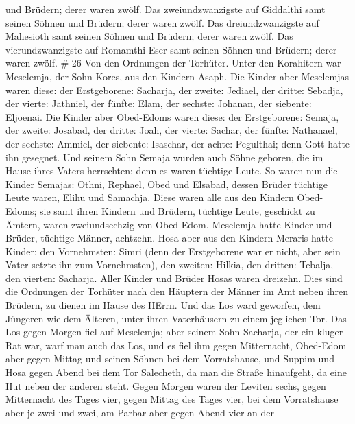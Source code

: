 und Brüdern; derer waren zwölf.  Das zweiundzwanzigste auf
Giddalthi samt seinen Söhnen und Brüdern; derer waren zwölf.
 Das dreiundzwanzigste auf Mahesioth samt seinen Söhnen und
Brüdern; derer waren zwölf.  Das vierundzwanzigste auf
Romamthi-Eser samt seinen Söhnen und Brüdern; derer waren zwölf. \# 26
 Von den Ordnungen der Torhüter. Unter den Korahitern war
Meselemja, der Sohn Kores, aus den Kindern Asaph.  Die
Kinder aber Meselemjas waren diese: der Erstgeborene: Sacharja, der
zweite: Jediael, der dritte: Sebadja, der vierte: Jathniel, 
der fünfte: Elam, der sechste: Johanan, der siebente: Eljoenai.
 Die Kinder aber Obed-Edoms waren diese: der Erstgeborene:
Semaja, der zweite: Josabad, der dritte: Joah, der vierte: Sachar, der
fünfte: Nathanael,  der sechste: Ammiel, der siebente:
Isaschar, der achte: Pegulthai; denn Gott hatte ihn gesegnet.
 Und seinem Sohn Semaja wurden auch Söhne geboren, die im
Hause ihres Vaters herrschten; denn es waren tüchtige Leute.
 So waren nun die Kinder Semajas: Othni, Rephael, Obed und
Elsabad, dessen Brüder tüchtige Leute waren, Elihu und Samachja.
 Diese waren alle aus den Kindern Obed-Edoms; sie samt ihren
Kindern und Brüdern, tüchtige Leute, geschickt zu Ämtern, waren
zweiundsechzig von Obed-Edom.  Meselemja hatte Kinder und
Brüder, tüchtige Männer, achtzehn.  Hosa aber aus den
Kindern Meraris hatte Kinder: den Vornehmsten: Simri (denn der
Erstgeborene war er nicht, aber sein Vater setzte ihn zum Vornehmsten),
 den zweiten: Hilkia, den dritten: Tebalja, den vierten:
Sacharja. Aller Kinder und Brüder Hosas waren dreizehn. 
Dies sind die Ordnungen der Torhüter nach den Häuptern der Männer im Amt
neben ihren Brüdern, zu dienen im Hause des HErrn.  Und das
Los ward geworfen, dem Jüngeren wie dem Älteren, unter ihren
Vaterhäusern zu einem jeglichen Tor.  Das Los gegen Morgen
fiel auf Meselemja; aber seinem Sohn Sacharja, der ein kluger Rat war,
warf man auch das Los, und es fiel ihm gegen Mitternacht, 
Obed-Edom aber gegen Mittag und seinen Söhnen bei dem Vorratshause,
 und Suppim und Hosa gegen Abend bei dem Tor Salecheth, da
man die Straße hinaufgeht, da eine Hut neben der anderen steht.
 Gegen Morgen waren der Leviten sechs, gegen Mitternacht
des Tages vier, gegen Mittag des Tages vier, bei dem Vorratshause aber
je zwei und zwei,  am Parbar aber gegen Abend vier an der
